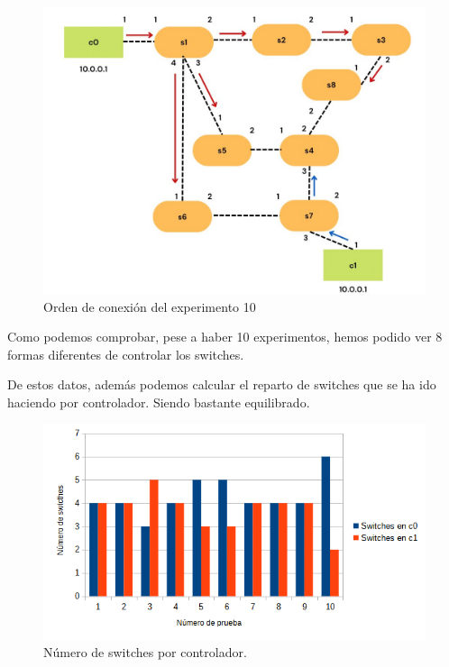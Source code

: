\documentclass[a4paper, 12pt]{book}
\begin{document}
 	\begin{figure}[H]
 		\centering
 		\includegraphics[width=16cm, keepaspectratio]{img/escenario1_2c_8}
 		\caption{Orden de conexión del experimento 10}
 		\label{figura:escenario1_2c_8}
 	\end{figure}
 	
 	Como podemos comprobar, pese a haber 10 experimentos, hemos podido ver 8 formas diferentes de controlar los switches.
 	
 	De estos datos, además podemos calcular el reparto de switches que se ha ido haciendo por controlador. Siendo bastante equilibrado.
 	
 	\begin{figure}[H]
 		\centering
 		\includegraphics[width=16cm, keepaspectratio]{img/switchesporcontrollerescenario1}
 		\caption{Número de switches por controlador.}
 		\label{figura:switchesporcontrollerescenario1}
 	\end{figure}
 	
\end{document}
